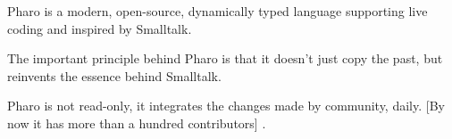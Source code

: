 Pharo is a modern, open-source, dynamically typed language supporting live coding and inspired by Smalltalk.

The important principle behind Pharo is that it doesn’t just copy the past, but reinvents the essence behind Smalltalk.

Pharo is not read-only, it integrates the changes made by community, daily. [By now it has more than a hundred contributors] \cite{PBE2}.
